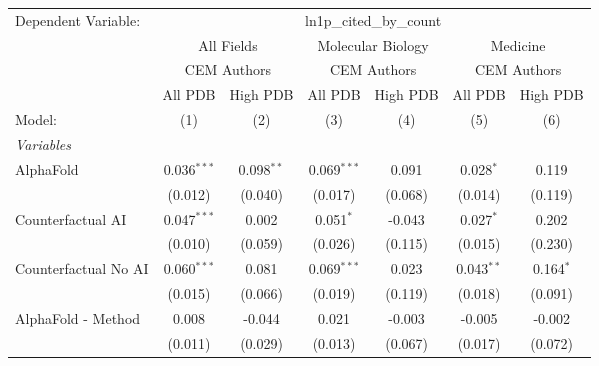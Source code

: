 \begingroup
\centering
\begin{tabular}{lcccccc}
   \tabularnewline \midrule \midrule
   Dependent Variable: & \multicolumn{6}{c}{ln1p\_cited\_by\_count}\\
 & \multicolumn{2}{c}{All Fields} & \multicolumn{2}{c}{Molecular Biology} & \multicolumn{2}{c}{Medicine} \\
\cmidrule(lr){2-3} \cmidrule(lr){4-5} \cmidrule(lr){6-7}
 & \multicolumn{2}{c}{CEM Authors} & \multicolumn{2}{c}{CEM Authors} & \multicolumn{2}{c}{CEM Authors} \\
\cmidrule(lr){2-3} \cmidrule(lr){4-5} \cmidrule(lr){6-7}
 & \multicolumn{1}{c}{All PDB} & \multicolumn{1}{c}{High PDB} & \multicolumn{1}{c}{All PDB} & \multicolumn{1}{c}{High PDB} & \multicolumn{1}{c}{All PDB} & \multicolumn{1}{c}{High PDB} \\
\cmidrule(lr){2-2} \cmidrule(lr){3-3} \cmidrule(lr){4-4} \cmidrule(lr){5-5} \cmidrule(lr){6-6} \cmidrule(lr){7-7}
   Model:                                                     & (1)            & (2)          & (3)           & (4)     & (5)            & (6)\\  
   \midrule
   \emph{Variables}\\
   AlphaFold                                                  & 0.036$^{***}$  & 0.098$^{**}$ & 0.069$^{***}$ & 0.091   & 0.028$^{*}$    & 0.119\\   
                                                              & (0.012)        & (0.040)      & (0.017)       & (0.068) & (0.014)        & (0.119)\\   
   Counterfactual AI                                          & 0.047$^{***}$  & 0.002        & 0.051$^{*}$   & -0.043  & 0.027$^{*}$    & 0.202\\   
                                                              & (0.010)        & (0.059)      & (0.026)       & (0.115) & (0.015)        & (0.230)\\   
   Counterfactual No AI                                       & 0.060$^{***}$  & 0.081        & 0.069$^{***}$ & 0.023   & 0.043$^{**}$   & 0.164$^{*}$\\   
                                                              & (0.015)        & (0.066)      & (0.019)       & (0.119) & (0.018)        & (0.091)\\   
   AlphaFold - Method                                         & 0.008          & -0.044       & 0.021         & -0.003  & -0.005         & -0.002\\   
                                                              & (0.011)        & (0.029)      & (0.013)       & (0.067) & (0.017)        & (0.072)\\   

\end{tabular}
